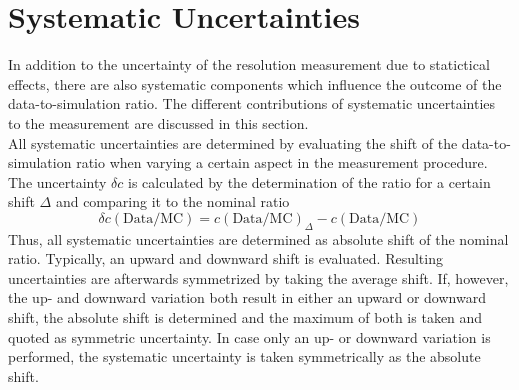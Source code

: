 \section{Systematic Uncertainties}
\label{sec:jer_syst_unc}
In addition to the uncertainty of the resolution measurement due to statictical effects, there are also systematic components which influence the outcome of the data-to-simulation ratio. The different contributions of systematic uncertainties to the measurement are discussed in this section.\\
All systematic uncertainties are determined by evaluating the shift of the data-to-simulation ratio when varying a certain aspect in the measurement procedure. The uncertainty $\delta c$ is calculated by the determination of the ratio for a certain shift $\Delta$ and comparing it to the nominal ratio 
 \begin{equation}
  \delta c{\mathrm{(Data/MC)}} = c{\mathrm{(Data/MC)}_{\Delta}} - c\mathrm{(Data/MC)}
 \end{equation} 
Thus, all systematic uncertainties are determined as absolute shift of the nominal ratio. Typically, an upward and downward shift is evaluated. Resulting uncertainties are afterwards symmetrized by taking the average shift. If, however, the up- and downward variation both result in either an upward or downward shift, the absolute shift is determined and the maximum of both is taken and quoted as symmetric uncertainty. In case only an up- or downward variation is performed, the systematic uncertainty is taken symmetrically as the absolute shift.   

